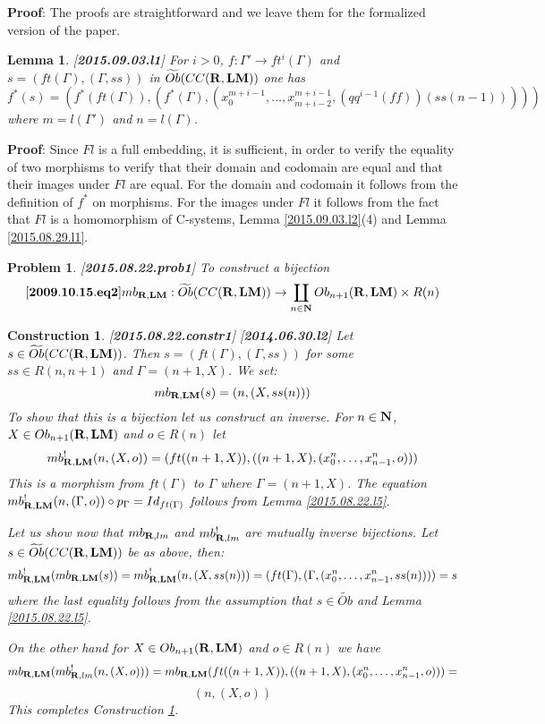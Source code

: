 \documentclass[11pt]{article}
\newenvironment{eq}{\begin{equation}}{\end{equation}}
\newenvironment{proof}{{\bf Proof}:}{\vskip 5mm }
\newtheorem{lemma}[proposition]{Lemma}
\newtheorem{problem}[proposition]{Problem}
\newtheorem{construction}[proposition]{Construction}
\newcommand{\llabel}[1]{\label{#1}[{\bf #1}]}
\newcommand{\sr}{\rightarrow}
\newcommand{\nn}{{\bf N\rm}}
\newcommand{\nat}{\nn}
\newcommand{\rr}{{\bf R}}
\newcommand{\lm}{{\bf LM}}
\newcommand{\wt}{\widetilde}
\begin{document}
%
\begin{proof}
The proofs are straightforward and we leave them for the formalized version of the paper.
\end{proof}
%
\begin{lemma}
\llabel{2015.09.03.l1}
For $i>0$, $f:\Gamma'\sr ft^i(\Gamma)$ and $s=(ft(\Gamma),(\Gamma,ss))$ in $\wt{Ob}(CC(\rr,\lm))$ one has
%
$$f^*(s)=(f^*(ft(\Gamma)),(f^*(\Gamma),(x_0^{m+i-1},\dots,x_{m+i-2}^{m+i-1},(qq^{i-1}(ff))(ss(n-1)))))$$
%
where $m=l(\Gamma')$ and $n=l(\Gamma)$.
\end{lemma}
%
\begin{proof}
Since $Fl$ is a full embedding, it is sufficient, in order to verify the equality of two morphisms to verify that their domain and codomain are equal and that their images under $Fl$ are equal. For the domain and codomain it follows from the definition of $f^*$ on morphisms. For the images under $Fl$ it follows from the fact that $Fl$ is a homomorphism of C-systems, Lemma \ref{2015.09.03.l2}(4) and
Lemma \ref{2015.08.29.l1}. 
\end{proof}
%
\begin{problem}
\llabel{2015.08.22.prob1}
To construct a bijection
%
\begin{eq}
\llabel{2009.10.15.eq2}
mb_{\rr,\lm}:\wt{Ob}(CC(\rr,\lm))\sr \coprod_{n\in\nat} Ob_{n+1}(\rr,\lm)\times R(n)
\end{eq}
%
\end{problem}
%
\begin{construction}\rm
\llabel{2015.08.22.constr1}
\llabel{2014.06.30.l2}
Let $s\in \wt{Ob}(CC(\rr,\lm))$. Then $s=(ft(\Gamma),(\Gamma,ss))$ for some $ss\in R(n,n+1)$ and $\Gamma=(n+1,X)$. We set:
%
$$mb_{\rr,\lm}(s)=(n, (X, ss(n)))$$
%
To show that this is a bijection let us construct an inverse. For $n\in\nat$, $X\in Ob_{n+1}(\rr,\lm)$ and $o\in R(n)$ let
%
$$mb_{\rr,\lm}^!(n,(X,o))=(ft((n+1,X)),((n+1,X),(x^{n}_0,\dots,x^{n}_{n-1},o)))$$
%
This is a morphism from $ft(\Gamma)$ to $\Gamma$ where $\Gamma=(n+1,X)$. The equation $mb_{\rr,\lm}^!(n,(\Gamma,o))\circ p_\Gamma=Id_{ft(\Gamma)}$ follows from Lemma \ref{2015.08.22.l5}. 

Let us show now that $mb_{\rr,lm}$ and $mb_{\rr,lm}^!$ are mutually inverse bijections. Let $s\in \wt{Ob}(CC(\rr,\lm))$ be as above, then:
%
$$mb_{\rr,\lm}^!(mb_{\rr,\lm}(s))=mb_{\rr,\lm}^!(n,(X,ss(n)))=(ft(\Gamma),(\Gamma,(x^{n}_0,\dots,x^{n}_{n-1},ss(n))))=s$$
%
where the last equality follows from the assumption that $s\in \wt{Ob}$ and Lemma \ref{2015.08.22.l5}.

On the other hand for $X\in Ob_{n+1}(\rr,\lm)$ and $o\in R(n)$ we have
%
$$mb_{\rr,\lm}(mb_{\rr,lm}^!(n,(X,o)))=mb_{\rr,\lm}(ft((n+1,X)),((n+1,X),(x^{n}_0,\dots,x^{n}_{n-1},o)))=$$
$$(n,(X,o))$$
%
This completes Construction \ref{2015.08.22.constr1}.
\end{construction}
\end{document}
